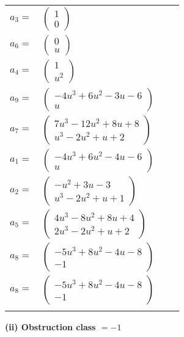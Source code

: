 \documentclass[1p]{elsarticle_modified}
\theoremstyle{definition}
\begin{document}
\begin{tabular}{m{7pt} m{180pt} m{7pt} m{180pt} }
\flushright $a_{3}=$&$\begin{pmatrix}1\\0\end{pmatrix}$ \\
\flushright $a_{6}=$&$\begin{pmatrix}0\\u\end{pmatrix}$ \\
\flushright $a_{4}=$&$\begin{pmatrix}1\\u^2\end{pmatrix}$ \\
\flushright $a_{9}=$&$\begin{pmatrix}-4 u^3+6 u^2-3 u-6\\u\end{pmatrix}$ \\
\flushright $a_{7}=$&$\begin{pmatrix}7 u^3-12 u^2+8 u+8\\u^3-2 u^2+u+2\end{pmatrix}$ \\
\flushright $a_{1}=$&$\begin{pmatrix}-4 u^3+6 u^2-4 u-6\\u\end{pmatrix}$ \\
\flushright $a_{2}=$&$\begin{pmatrix}- u^2+3 u-3\\u^3-2 u^2+u+1\end{pmatrix}$ \\
\flushright $a_{5}=$&$\begin{pmatrix}4 u^3-8 u^2+8 u+4\\2 u^3-2 u^2+u+2\end{pmatrix}$ \\
\flushright $a_{8}=$&$\begin{pmatrix}-5 u^3+8 u^2-4 u-8\\-1\end{pmatrix}$\\ \flushright $a_{8}=$&$\begin{pmatrix}-5 u^3+8 u^2-4 u-8\\-1\end{pmatrix}$\\&\end{tabular}
\flushleft \textbf{(ii) Obstruction class $= -1$}\\~\\
\end{document}
